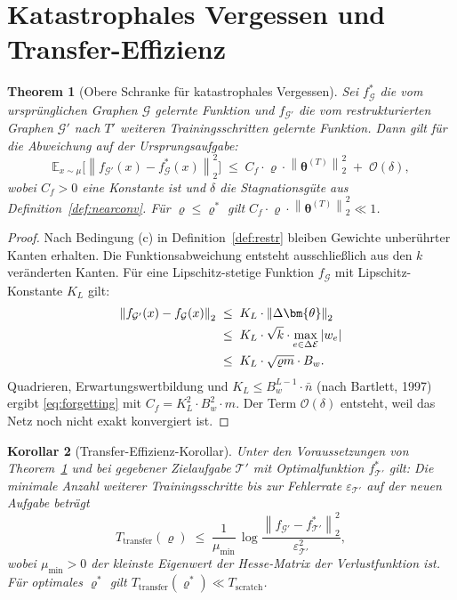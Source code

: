 \documentclass[12pt, a4paper, openany]{report}
\newtheorem{theorem}{Theorem}[chapter]
\newtheorem{corollary}[theorem]{Korollar}
\newcommand{\E}{\mathbb{E}}
\newcommand{\calG}{\mathcal{G}}
\newcommand{\calE}{\mathcal{E}}
\newcommand{\norms}[1]{\left\|#1\right\|}
\newcommand{\eps}{\varepsilon}
\begin{document}
\section{Katastrophales Vergessen und Transfer-Effizienz}
\label{sec:forgetting}

\begin{theorem}[Obere Schranke für katastrophales Vergessen]
\label{thm:forgetting}
Sei $f^*_{\calG}$ die vom ursprünglichen Graphen $\calG$ gelernte Funktion
und $f_{\calG'}$ die vom restrukturierten Graphen $\calG'$ nach
$T'$ weiteren Trainingsschritten gelernte Funktion.  Dann gilt für die
Abweichung auf der Ursprungsaufgabe:
\begin{equation}
  \label{eq:forgetting}
  \E_{x \sim \mu}\bigl[\norms{f_{\calG'}(x) - f^*_{\calG}(x)}_2^2\bigr]
  \;\leq\;
  C_f \cdot \varrho \cdot \norms{\bm{\theta}^{(T)}}_2^2
  \;+\; \mathcal{O}(\delta),
\end{equation}
wobei $C_f > 0$ eine Konstante ist und $\delta$ die Stagnationsgüte aus
Definition~\ref{def:nearconv}.  Für $\varrho \leq \varrho^*$ gilt
$C_f \cdot \varrho \cdot \norms{\bm{\theta}^{(T)}}_2^2 \ll 1$.
\end{theorem}

\begin{proof}
Nach Bedingung (c) in Definition~\ref{def:restr} bleiben Gewichte
unberührter Kanten erhalten.  Die Funktionsabweichung entsteht ausschließlich
aus den $k$ veränderten Kanten.  Für eine Lipschitz-stetige Funktion
$f_{\calG}$ mit Lipschitz-Konstante $K_L$ gilt:
\begin{align}
  \norms{f_{\calG'}(x) - f_{\calG}(x)}_2
  &\;\leq\; K_L \cdot \norms{\Delta\bm{\theta}}_2 \notag \\
  &\;\leq\; K_L \cdot \sqrt{k} \cdot \max_{e \in \Delta\calE} |w_e| \notag \\
  &\;\leq\; K_L \cdot \sqrt{\varrho m} \cdot B_w.
\end{align}
Quadrieren, Erwartungswertbildung und $K_L \leq B_w^{L-1} \cdot \bar{n}$
(nach Bartlett, 1997) ergibt \eqref{eq:forgetting} mit
$C_f = K_L^2 \cdot B_w^2 \cdot m$.  Der Term $\mathcal{O}(\delta)$
entsteht, weil das Netz noch nicht exakt konvergiert ist.
\end{proof}

\begin{corollary}[Transfer-Effizienz-Korollar]
\label{cor:transfer}
Unter den Voraussetzungen von Theorem~\ref{thm:forgetting} und bei
gegebener Zielaufgabe $\mathcal{T}'$ mit Optimalfunktion $f^*_{\mathcal{T}'}$
gilt: Die minimale Anzahl weiterer Trainingsschritte bis zur Fehlerrate
$\eps_{\mathcal{T}'}$ auf der neuen Aufgabe beträgt
\begin{equation}
  \label{eq:transfer_steps}
  T_{\mathrm{transfer}}(\varrho)
  \;\leq\;
  \frac{1}{\mu_{\min}}\,\log\!\frac{\norms{f_{\calG'} - f^*_{\mathcal{T}'}}_2^2}{\eps_{\mathcal{T}'}^2},
\end{equation}
wobei $\mu_{\min} > 0$ der kleinste Eigenwert der Hesse-Matrix der Verlustfunktion ist.
Für optimales $\varrho^*$ gilt $T_{\mathrm{transfer}}(\varrho^*) \ll T_{\mathrm{scratch}}$.
\end{corollary}
\end{document}
